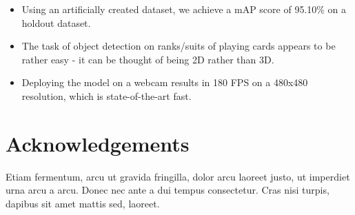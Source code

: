\documentclass[a0,landscape]{a0poster}
\begin{document}
\begin{multicols}{3}
\begin{itemize}
\item Using an artificially created dataset, we achieve a mAP score of 95.10\% on a holdout dataset.
\item The task of object detection on ranks/suits of playing cards appears to be rather easy - it can be thought of being 2D rather than 3D.
\item Deploying the model on a webcam results in 180 FPS on a 480x480 resolution, which is state-of-the-art fast.

\end{itemize}

\color{DarkSlateGray} %


\nocite{*} %


\section*{Acknowledgements}

Etiam fermentum, arcu ut gravida fringilla, dolor arcu laoreet justo, ut imperdiet urna arcu a arcu. Donec nec ante a dui tempus consectetur. Cras nisi turpis, dapibus sit amet mattis sed, laoreet.


\end{multicols}
\end{document}
